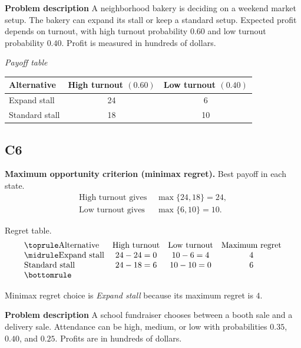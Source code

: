 	\begin{ExamProblems}
		\item
		\textbf{Problem description}
		A neighborhood bakery is deciding on a weekend market setup. The bakery can expand its stall or keep a standard setup. Expected profit depends on turnout, with high turnout probability $0.60$ and low turnout probability $0.40$. Profit is measured in hundreds of dollars.

		\begin{center}
			\textit{Payoff table}\\
			\begin{tabular}{l c c}
				\toprule
				Alternative & High turnout $(0.60)$ & Low turnout $(0.40)$ \\
				\midrule
				Expand stall & 24 & 6 \\
				Standard stall & 18 & 10 \\
				\bottomrule
			\end{tabular}
		\end{center}

		\subsection*{C6}
		\textbf{Maximum opportunity criterion (minimax regret).} Best payoff in each state.
		\[
		\begin{aligned}
		\text{High turnout gives } &\max\{24,18\}=24,\\
		\text{Low turnout gives } &\max\{6,10\}=10.
		\end{aligned}
		\]

		Regret table.
		\[
		\begin{array}{lccc}
			\toprule
			\text{Alternative} & \text{High turnout} & \text{Low turnout} & \text{Maximum regret}\\
			\midrule
			\text{Expand stall} & 24-24=0 & 10-6=4 & 4\\
			\text{Standard stall} & 24-18=6 & 10-10=0 & 6\\
			\bottomrule
		\end{array}
		\]

		Minimax regret choice is \emph{Expand stall} because its maximum regret is $4$.

		\item
		\textbf{Problem description}
		A school fundraiser chooses between a booth sale and a delivery sale. Attendance can be high, medium, or low with probabilities $0.35$, $0.40$, and $0.25$. Profits are in hundreds of dollars.


\end{ExamProblems}

